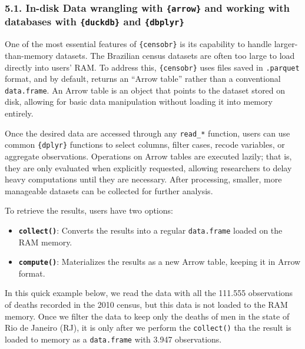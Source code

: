 \documentclass[
]{article}
\providecommand{\tightlist}{%
  \setlength{\itemsep}{0pt}\setlength{\parskip}{0pt}}
\begin{document}
\subsubsection{\texorpdfstring{5.1. In-disk Data wrangling with
\texttt{\{arrow\}} and working with databases with \texttt{\{duckdb\}}
and
\texttt{\{dbplyr\}}}{5.1. In-disk Data wrangling with \{arrow\} and working with databases with \{duckdb\} and \{dbplyr\}}}\label{in-disk-data-wrangling-with-arrow-and-working-with-databases-with-duckdb-and-dbplyr}

One of the most essential features of \texttt{\{censobr\}} is its
capability to handle larger-than-memory datasets. The Brazilian census
datasets are often too large to load directly into users' RAM. To
address this, \texttt{\{censobr\}} uses files saved in \texttt{.parquet}
format, and by default, returns an ``Arrow table'' rather than a
conventional \texttt{data.frame}. An Arrow table is an object that
points to the dataset stored on disk, allowing for basic data
manipulation without loading it into memory entirely.

Once the desired data are accessed through any \texttt{read\_*}
function, users can use common \texttt{\{dplyr\}} functions to select
columns, filter cases, recode variables, or aggregate observations.
Operations on Arrow tables are executed lazily; that is, they are only
evaluated when explicitly requested, allowing researchers to delay heavy
computations until they are necessary. After processing, smaller, more
manageable datasets can be collected for further analysis.

To retrieve the results, users have two options:

\begin{itemize}
\tightlist
\item
  \textbf{\texttt{collect()}}: Converts the results into a regular
  \texttt{data.frame} loaded on the RAM memory.
\item
  \textbf{\texttt{compute()}}: Materializes the results as a new Arrow
  table, keeping it in Arrow format.
\end{itemize}

In this quick example below, we read the data with all the 111.555
observations of deaths recorded in the 2010 census, but this data is not
loaded to the RAM memory. Once we filter the data to keep only the
deaths of men in the state of Rio de Janeiro (RJ), it is only after we
perform the \texttt{collect()} tha the result is loaded to memory as a
\texttt{data.frame} with 3.947 observations.
\end{document}
